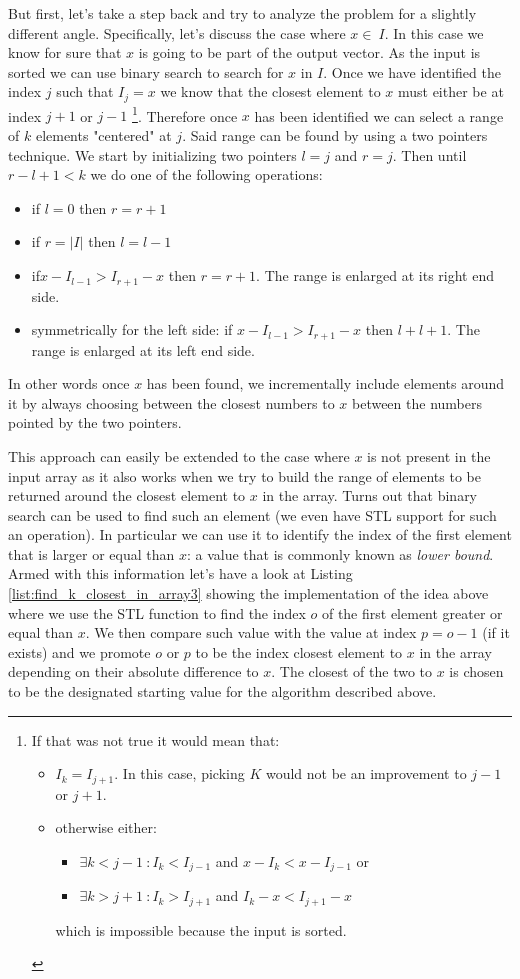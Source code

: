 But first, let's take a step back and try to analyze the problem for a slightly different angle. Specifically,
let's discuss the case where $x \in \: I$. In this case we know for sure that $x$ is going to be
part of the output vector. As the input is sorted we can use binary search to search for $x$ in
$I$. Once we have identified the index $j$ such that $I_j = x$ we know that the closest element to
$x$ must either be at index $j+1$ or $j-1$ \footnote{If that was not true it would mean that:
\begin{itemize}
	\item $I_k = I_{j+1}$. In this case, picking $K$  would not be an improvement to $j-1$ or $j+1$.
	\item otherwise either:
	\begin{itemize}
		\item $\exists k < j-1 \: : I_k < I_{j-1}$ and  $x-I_k < x-I_{j-1}$ or
		\item $\exists k > j+1 \: : I_k > I_{j+1}$ and  $I_k-x < I_{j+1}-x$ \end{itemize} which is
	impossible because the input is sorted. \end{itemize}}. Therefore once $x$ has been identified
	we can select a range of $k$ elements "centered" at $j$. Said range can be found by using a two
	pointers technique. We start by initializing two pointers $l = j$ and $r = j$. Then until $r-l+1
	< k$ we do one of the following operations:
\begin{itemize}
	\item if $l = 0$ then $r = r+1$
	\item if $r = |I|$ then $l = l-1$
	\item if$ x-I_{l-1} > I_{r+1}-x$ then $r = r+1$. The range is enlarged at its right end
	side.
	\item symmetrically for the left side: if $x-I_{l-1} > I_{r+1}-x$ then $ l + l+1$. The range is
	enlarged at its left end side.
\end{itemize}
In other words once $x$ has been found, we incrementally include elements around it by always
choosing between the closest numbers to $x$ between the numbers pointed by the two pointers.

This approach can easily be extended to the case where $x$ is not present in the input array as it
also works when we try to build the range of elements to be returned around the closest element to
$x$ in the array. 
Turns out that binary search can be used to find such an element (we even have STL
support for such an operation). 
In particular we can use it to identify the index of the first element that is larger or equal than $x$:
a value that is commonly known as \textit{lower bound}.
Armed with this information let's have a look at Listing \ref{list:find_k_closest_in_array3} showing
the implementation of the idea above where we use the STL  function to find
the index $o$ of the first element greater or equal than $x$.
We then compare such value with the value at index $p = o-1$ (if it exists)
and we promote $o$ or $p$ to be the index closest element to $x$ in the array depending on their
absolute difference to $x$.
The closest of the two to $x$ is chosen to be the designated starting value for the algorithm described above.

